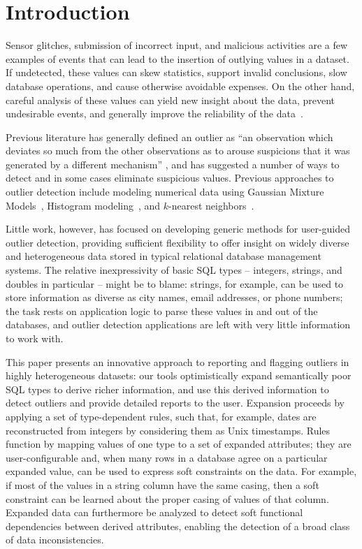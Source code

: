 \section{Introduction}
\label{sec:intro}

Sensor glitches, submission of incorrect input, and malicious activities are a few examples of events that can lead to the insertion of outlying values in a dataset. If undetected, these values can skew statistics, support invalid conclusions, slow database operations, and cause otherwise avoidable expenses. On the other hand, careful analysis of these values can yield new insight about the data, prevent undesirable events, and generally improve the reliability of the data~\cite{Achour2014}.

Previous literature has generally defined an outlier as ``an observation which deviates so much from the other observations as to arouse suspicions that it was generated by a different mechanism'' \cite{Hawkins1980}, and has suggested a number of ways to detect and in some cases eliminate suspicious values. Previous approaches to outlier detection include modeling numerical data using Gaussian Mixture Models~\cite{Lu2005,Roberts1994,Roberts1999}, Histogram modeling~\cite{Gebski2007,Sheng2007}, and $k$-nearest neighbors~\cite{Ramaswamy2000}.

Little work, however, has focused on developing generic methods for user-guided outlier detection, providing sufficient flexibility to offer insight on widely diverse and heterogeneous data stored in typical relational database management systems. The relative inexpressivity of basic SQL types -- integers, strings, and doubles in particular -- might be to blame: strings, for example, can be used to store information as diverse as city names, email addresses, or phone numbers; the task rests on application logic to parse these values in and out of the databases, and outlier detection applications are left with very little information to work with.

This paper presents an innovative approach to reporting and flagging outliers in highly heterogeneous datasets: our tools optimistically expand semantically poor SQL types to derive richer information, and use this derived information to detect outliers and provide detailed reports to the user. Expansion proceeds by applying a set of type-dependent rules, such that, for example, dates are reconstructed from integers by considering them as Unix timestamps. Rules function by mapping values of one type to a set of expanded attributes; they are user-configurable and, when many rows in a database agree on a particular expanded value, can be used to express soft constraints on the data. For example, if most of the values in a string column have the same casing, then a soft constraint can be learned about the proper casing of values of that column. Expanded data can furthermore be analyzed to detect soft functional dependencies between derived attributes, enabling the detection of a broad class of data inconsistencies.

